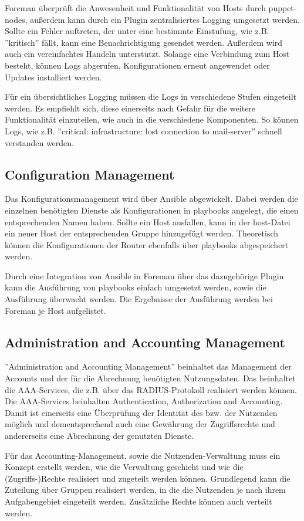 Foreman überprüft die Anwesenheit und Funktionalität von Hosts durch puppet-nodes, außerdem kann durch ein Plugin zentralisiertes Logging umgesetzt werden. Sollte ein Fehler auftreten, der unter eine bestimmte Einstufung, wie z.B. ''kritisch'' fällt, kann eine Benachrichtigung gesendet werden. Außerdem wird auch ein vereinfachtes Handeln unterstützt. Solange eine Verbindung zum Host besteht, können Logs abgerufen, Konfigurationen erneut angewendet oder Updates installiert werden.

Für ein übersichtliches Logging müssen die Logs in verschiedene Stufen eingeteilt werden. Es empfiehlt sich, diese einerseits nach Gefahr für die weitere Funktionalität einzuteilen, wie auch in die verschiedene Komponenten. So können Logs, wie z.B. ''critical: infrastructure: lost connection to mail-server'' schnell verstanden werden.

\subsection{Configuration Management}
Das Konfigurationsmanagement wird über Ansible abgewickelt. Dabei werden die einzelnen benötigten Dienste als Konfigurationen in playbooks angelegt, die einen entsprechenden Namen haben. Sollte ein Host ausfallen, kann in der host-Datei ein neuer Host der entsprechenden Gruppe hinzugefügt werden. Theoretisch können die Konfigurationen der Router ebenfalls über playbooks abgespeichert werden. 

Durch eine Integration von Ansible in Foreman über das dazugehörige Plugin kann die Ausführung von playbooks einfach umgesetzt werden, sowie die Ausführung überwacht werden. Die Ergebnisse der Ausführung werden bei Foreman je Host aufgelistet.

\subsection{Administration and Accounting Management}
''Administration and Accounting Management'' beinhaltet das Management der Accounts und der für die Abrechnung benötigten Nutzungsdaten. Das beinhaltet die AAA-Services, die z.B. über das RADIUS-Protokoll realisiert werden können. Die AAA-Services beinhalten Authentication, Authorization and Accounting. Damit ist einerseits eine Überprüfung der Identität des bzw. der Nutzenden möglich und dementsprechend auch eine Gewährung der Zugriffsrechte und andererseits eine Abrechnung der genutzten Dienste.

Für das Accounting-Management, sowie die Nutzenden-Verwaltung muss ein Konzept erstellt werden, wie die Verwaltung geschieht und wie die (Zugriffs-)Rechte realisiert und zugeteilt werden können. Grundlegend kann die Zuteilung über Gruppen realisiert werden, in die die Nutzenden je nach ihrem Aufgabengebiet eingeteilt werden. Zusätzliche Rechte können auch verteilt werden.

